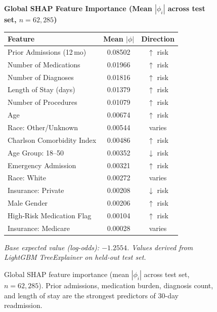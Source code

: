 \documentclass[11pt,letterpaper]{article}
\begin{document}
\begin{figure}[H]
\centering
\begin{tcolorbox}[
  enhanced, colback=niw-box, colframe=niw-blue,
  boxrule=0.6pt, arc=4pt, left=8pt, right=8pt, top=6pt, bottom=6pt,
  width=0.88\textwidth
]
\small\textbf{Global SHAP Feature Importance (Mean $|\phi_i|$ across test set, $n=62{,}285$)}
\medskip
\begin{center}
\begin{tabular}{@{}lcc@{}}
\toprule
\textbf{Feature} & \textbf{Mean $|\phi|$} & \textbf{Direction} \\
\midrule
Prior Admissions (12\,mo)      & 0.08502 & $\uparrow$ risk \\
Number of Medications          & 0.01966 & $\uparrow$ risk \\
Number of Diagnoses            & 0.01816 & $\uparrow$ risk \\
Length of Stay (days)          & 0.01379 & $\uparrow$ risk \\
Number of Procedures           & 0.01079 & $\uparrow$ risk \\
Age                            & 0.00674 & $\uparrow$ risk \\
Race: Other/Unknown            & 0.00544 & varies \\
Charlson Comorbidity Index     & 0.00486 & $\uparrow$ risk \\
Age Group: 18--50              & 0.00352 & $\downarrow$ risk \\
Emergency Admission            & 0.00321 & $\uparrow$ risk \\
Race: White                    & 0.00272 & varies \\
Insurance: Private             & 0.00208 & $\downarrow$ risk \\
Male Gender                    & 0.00206 & $\uparrow$ risk \\
High-Risk Medication Flag       & 0.00104 & $\uparrow$ risk \\
Insurance: Medicare            & 0.00028 & varies \\
\bottomrule
\end{tabular}
\end{center}
\smallskip
\footnotesize\textit{Base expected value (log-odds): $-1.2554$. Values derived from LightGBM TreeExplainer on held-out test set.}
\end{tcolorbox}
\caption{Global SHAP feature importance (mean $|\phi_i|$ across test set, $n = 62{,}285$). Prior admissions, medication burden, diagnosis count, and length of stay are the strongest predictors of 30-day readmission.}
\label{fig:shap_global}
\end{figure}
\end{document}
